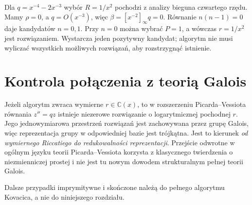 \begin{przyklad}
\label{aa:prz:kov-rational-fourth}
Dla $q=x^{-4}-2x^{-3}$
wybór $R=1/x^2$
pochodzi z analizy
bieguna czwartego rzędu.
Mamy $\rho=0$, a
$q=O(x^{-3})$, więc
$\beta=[x^{-2}]_\infty q=0$.
Równanie
$n(n-1)=0$ daje
kandydatów $n=0,1$.
Przy $n=0$ można
wybrać $P=1$,
a wówczas $r=1/x^2$
jest rozwiązaniem.
Wystarcza jeden
pozytywny kandydat;
algorytm nie musi
wyliczać wszystkich
możliwych rozwiązań,
aby rozstrzygnąć istnienie.
\end{przyklad}

\section{Kontrola połączenia z teorią Galois}

Jeżeli algorytm zwraca
wymierne $r\in\mathbb C(x)$,
to w rozszerzeniu
Picarda--Vessiota równania
$z''=qz$ istnieje
niezerowe rozwiązanie
o logarytmicznej pochodnej
$r$. Jego jednowymiarowa
przestrzeń rozwiązań
jest zachowywana przez
grupę Galois, więc
reprezentacja grupy
w odpowiedniej bazie
jest trójkątna.
Jest to kierunek
\emph{od wymiernego Riccatiego
do redukowalności reprezentacji}.
Przejście odwrotne
w ogólnym języku teorii
Picarda--Vessiota korzysta
z klasycznego twierdzenia
o niezmienniczej prostej
i nie jest tu nowym
dowodem strukturalnym
pełnej teorii Galois.

Dalsze przypadki
imprymitywne i skończone
należą do pełnego algorytmu
Kovacica, a nie do
niniejszego rozdziału.

